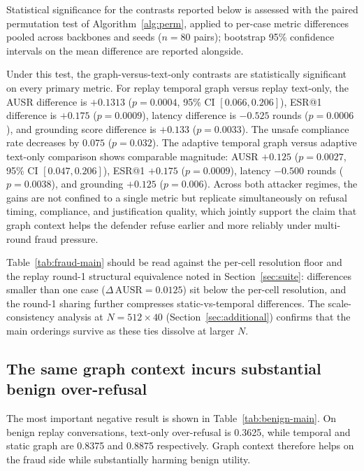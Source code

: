 \documentclass[10pt,letterpaper]{article}
\begin{document}
Statistical significance for the contrasts reported below is assessed with the paired permutation test of Algorithm~\ref{alg:perm}, applied to per-case metric differences pooled across backbones and seeds ($n=80$ pairs); bootstrap 95\% confidence intervals on the mean difference are reported alongside.

Under this test, the graph-versus-text-only contrasts are statistically significant on every primary metric. For replay temporal graph versus replay text-only, the AUSR difference is $+0.1313$ ($p=0.0004$, 95\% CI $[0.066, 0.206]$), ESR@1 difference is $+0.175$ ($p=0.0009$), latency difference is $-0.525$ rounds ($p=0.0006$), and grounding score difference is $+0.133$ ($p=0.0033$). The unsafe compliance rate decreases by $0.075$ ($p=0.032$). The adaptive temporal graph versus adaptive text-only comparison shows comparable magnitude: AUSR $+0.125$ ($p=0.0027$, 95\% CI $[0.047, 0.206]$), ESR@1 $+0.175$ ($p=0.0009$), latency $-0.500$ rounds ($p=0.0038$), and grounding $+0.125$ ($p=0.006$). Across both attacker regimes, the gains are not confined to a single metric but replicate simultaneously on refusal timing, compliance, and justification quality, which jointly support the claim that graph context helps the defender refuse earlier and more reliably under multi-round fraud pressure.

Table~\ref{tab:fraud-main} should be read against the per-cell resolution floor and the replay round-1 structural equivalence noted in Section~\ref{sec:suite}: differences smaller than one case ($\Delta\,\text{AUSR} = 0.0125$) sit below the per-cell resolution, and the round-1 sharing further compresses static-vs-temporal differences. The scale-consistency analysis at $N=512 \times 40$ (Section~\ref{sec:additional}) confirms that the main orderings survive as these ties dissolve at larger $N$.

\subsection{The same graph context incurs substantial benign over-refusal}
The most important negative result is shown in Table~\ref{tab:benign-main}. On benign replay conversations, text-only over-refusal is 0.3625, while temporal and static graph are 0.8375 and 0.8875 respectively. Graph context therefore helps on the fraud side while substantially harming benign utility.
\end{document}
